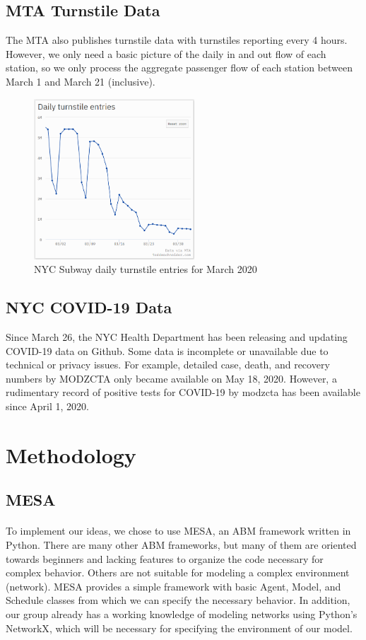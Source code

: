 \documentclass[12pt, a4, epsf] {article}
\theoremstyle{plain}
\theoremstyle{definition}
\begin{document}
\subsection{MTA Turnstile Data \cite{mta_turnstiles}}
The MTA also publishes turnstile data with turnstiles reporting every 4 hours. However, we only need a basic picture of the daily in and out flow of each station, so we only process the aggregate passenger flow of each station between March 1 and March 21 (inclusive). 
\begin{figure}
    \includegraphics[width=6cm]{Scratch_Visuals/schneider_ridership.png}
    \caption{NYC Subway daily turnstile entries for March 2020 \cite{toddwschneider}}
\end{figure}
\subsection{NYC COVID-19 Data}
Since March 26, the NYC Health Department has been releasing and updating COVID-19 data on Github\cite{nychealth_2020}. Some data is incomplete or unavailable due to technical or privacy issues. For example, detailed case, death, and recovery numbers by MODZCTA only became available on May 18, 2020. However, a rudimentary record of positive tests for COVID-19 by modzcta has been available since April 1, 2020.
\section{Methodology}
\subsection{MESA\cite{Mesa}}
\paragraph{}
To implement our ideas, we chose to use MESA, an ABM framework written in Python. There are many other ABM frameworks, but many of them are oriented towards beginners and lacking features to organize the code necessary for complex behavior. Others are not suitable for modeling a complex environment (network). MESA provides a simple framework with basic Agent, Model, and Schedule classes from which we can specify the necessary behavior. In addition, our group already has a working knowledge of modeling networks using Python's NetworkX\cite{hagberg-2008-exploring}, which will be necessary for specifying the environment of our model.
\end{document}
